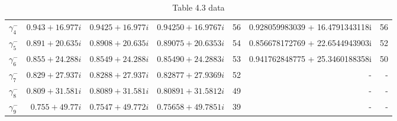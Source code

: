 \documentclass[a4paper]{article}
\begin{document}
\begin{table}
\begin{adjustbox}{width=1\textwidth}
\begin{tabular}{c | r | r | r | r | r | r}
 $\gamma_4^{-}$ & $ 0.943 + 16.977 i $ & $ 0.9425 + 16.977 i$ & $ 0.94250  + 16.9767 i$ & 56  &0.928059983039 +  16.4791343118i& 56  \\
 $\gamma_5^{-}$ & $ 0.891 + 20.635 i $ & $ 0.8908 + 20.635 i$ & $ 0.89075  + 20.6353 i$ & 54  &0.856678172769 +  22.6544943903i & 52 \\
 $\gamma_6^{-}$ & $ 0.855 + 24.288 i $ & $ 0.8549 + 24.288 i$ & $ 0.85490  + 24.2883 i$ & 53  &0.941762848775 +  25.3460188358i & 50 \\
 $\gamma_7^{-}$ & $ 0.829 + 27.937 i $ & $ 0.8288 + 27.937 i$ & $ 0.82877  + 27.9369 i$ & 52  &- & - \\
 $\gamma_8^{-}$ & $ 0.809 + 31.581 i $ & $ 0.8089 + 31.581 i$ & $ 0.80891  + 31.5812 i$ & 49  &- & - \\
 $\gamma_9^{-}$ & $ 0.755 + 49.77  i $ & $ 0.7547 + 49.772 i$ & $ 0.75658  + 49.7851 i$ & 39  &- & - \\ \hline
 \end{tabular}
\end{adjustbox}
 \caption{Table 4.3 data}
 \label{Table43}
\end{table}
\end{document}
